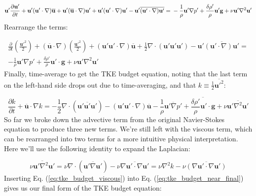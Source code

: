 \documentclass[12pt]{article}
\numberwithin{equation}{section}
\numberwithin{figure}{section}
\numberwithin{table}{section}
\begin{document}
\begin{equation}
  \mathbf{u}'\frac{\partial \mathbf{u}'}{\partial t} +
  \mathbf{u}' (\mathbf{u}' \cdot \nabla) \overline{\mathbf{u}} +
  \mathbf{u}' (\overline{\mathbf{u}} \cdot \nabla) \mathbf{u}' +
  \mathbf{u}' (\mathbf{u}' \cdot \nabla) \mathbf{u}' -
  \mathbf{u}' \overline{(\mathbf{u}' \cdot \nabla) \mathbf{u}'} = \\
  - \frac{1}{\rho} \mathbf{u}' \nabla p'
  + \frac{\delta \rho'}{\rho} \mathbf{u}' \mathbf{g}
  + \nu \mathbf{u}' \nabla^2 \mathbf{u}'
\end{equation}
Rearrange the terms:

\begin{equation}
  \begin{split}
  \frac{\partial}{\partial t} \left( \frac{\mathbf{u}'^2}{2} \right) +
  (\overline{\mathbf{u}} \cdot \nabla) \left( \frac{\mathbf{u}'^2}{2} \right) +
  (\mathbf{u}' \mathbf{u}' \cdot \nabla) \overline{\mathbf{u}} +
  \frac{1}{2} \nabla \cdot (\mathbf{u}' \mathbf{u}' \mathbf{u}') -
  \mathbf{u}' \overline{(\mathbf{u}' \cdot \nabla) \mathbf{u}'} = \\
  - \frac{1}{\rho} \mathbf{u}' \nabla p'
  + \frac{\delta \rho'}{\rho} \mathbf{u}' \cdot \mathbf{g}
  + \nu \mathbf{u}' \nabla^2 \mathbf{u}'
  \end{split}
\end{equation}
Finally, time-average to get the TKE budget equation, noting that the last term
on the left-hand side drops out due to time-averaging, and that
$k \equiv \frac{1}{2} \overline{\mathbf{u}'^2}$:

\begin{equation}
  \frac{\partial k}{\partial t} + \overline{\mathbf{u}} \cdot \nabla k =
  - \frac{1}{2} \nabla \cdot (\overline{\mathbf{u}' \mathbf{u}' \mathbf{u}'})
  - (\mathbf{u}' \mathbf{u}' \cdot \nabla) \overline{\mathbf{u}}
  - \frac{1}{\rho} \overline{\mathbf{u}' \nabla p'}
  + \overline{\frac{\delta \rho'}{\rho} \mathbf{u}' \cdot \mathbf{g}}
  + \nu \overline{\mathbf{u}' \nabla^2 \mathbf{u}'}
  \label{eq:tke_budget_near_final}
\end{equation}
So far we broke down the advective term from the original Navier-Stokes equation
to produce three new terms.
We're still left with the viscous term, which can be rearranged into two terms
for a more intuitive physical interpretation.
Here we'll use the following identity to expand the Laplacian:

\begin{equation}
  \overline{\nu \mathbf{u}' \nabla^2 \mathbf{u}'} =
  \nu \nabla \cdot (\overline{\mathbf{u}' \nabla \mathbf{u}'}) -
  \nu \overline{\nabla \mathbf{u}' \cdot \nabla \mathbf{u}'} =
  \nu \nabla^2 k - \nu \overline{(\nabla \mathbf{u}' \cdot \nabla \mathbf{u}')}
  \label{eq:tke_budget_viscous}
\end{equation}
Inserting Eq. (\ref{eq:tke_budget_viscous}) into Eq. (\ref{eq:tke_budget_near_final})
gives us our final form of the TKE budget equation:
\end{document}
